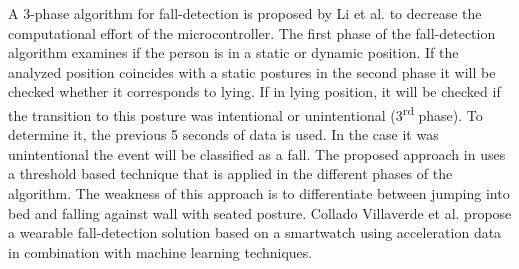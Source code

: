 \documentclass[review]{elsarticle}
\begin{document}
A 3-phase algorithm for fall-detection is proposed by Li et al. \cite{Li2009} to decrease the computational effort of the microcontroller. The first phase of the fall-detection algorithm examines if the person is in a static or dynamic position. If the analyzed position coincides with a static postures in the second phase it will be checked whether it corresponds to lying. If in lying position, it will be checked if the transition to this posture was intentional or unintentional (3\textsuperscript{rd} phase). To determine it, the previous 5 seconds of data is used. In the case it was unintentional the event will be classified as a fall. The proposed approach in \cite{Li2009} uses a threshold based technique that is applied in the different phases of the algorithm. The weakness of this approach is to differentiate between jumping into bed and falling against wall with seated posture. Collado Villaverde et al. \cite{colladomachine} propose a wearable fall-detection solution based on a smartwatch using acceleration data in combination with machine learning techniques.
\end{document}

